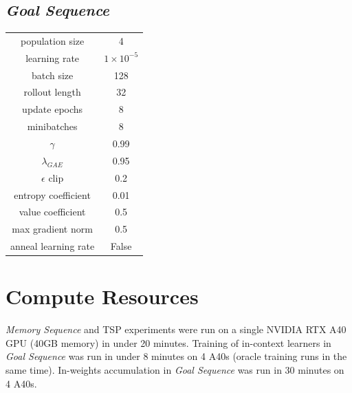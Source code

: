 \documentclass{article}
\begin{document}
\subsection{\textit{Goal Sequence}}

\begin{center}
\begin{tabular}{ c c }
 population size & 4 \\
 learning rate & $1 \times 10^{-5}$ \\ 
 batch size & 128 \\  
 rollout length & 32 \\
 update epochs & 8 \\
 minibatches & 8 \\
 $\gamma$ & 0.99 \\
 $\lambda_{GAE}$ & 0.95 \\
 $\epsilon$ clip & 0.2 \\
 entropy coefficient & 0.01 \\
 value coefficient & 0.5 \\
 max gradient norm & 0.5 \\
 anneal learning rate & False
\end{tabular}
\end{center}

\newpage
\section{Compute Resources}
\label{A:compute}

\textit{Memory Sequence} and TSP experiments were run on a single NVIDIA RTX A40 GPU (40GB memory) in under 20 minutes. Training of in-context learners in \textit{Goal Sequence} was run in under 8 minutes on 4 A40s (oracle training runs in the same time). In-weights accumulation in \textit{Goal Sequence} was run in 30 minutes on 4 A40s.





\end{document}
